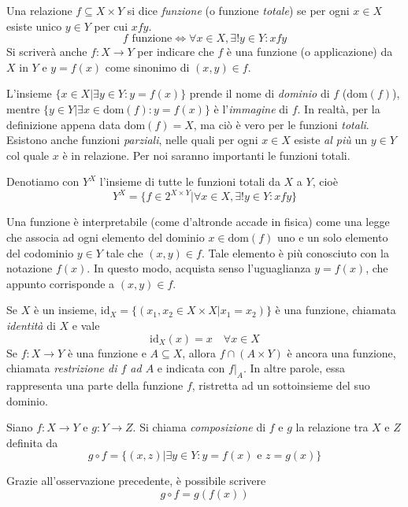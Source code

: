 \begin{tcolorbox}[colback=yellow!30, colframe=yellow!30!black, title={Funzione}]
Una relazione $f\subseteq X\times Y$ si dice \textit{funzione} (o funzione
\textit{totale}) se per ogni $x\in X$ esiste unico $y\in Y$ per cui $xfy$.
\[ f \text{ funzione} \Longleftrightarrow \forall x\in X,\exists!y\in Y:xfy \]
Si scriverà anche $f:X\to Y$ per indicare che $f$ è una funzione (o applicazione)
da $X$ in $Y$ e $y=f(x)$ come sinonimo di $(x,y)\in f$.
\end{tcolorbox}

L'insieme $\{x\in X|\exists y\in Y: y=f(x)\}$ prende il nome di \textit{dominio}
di $f$ ($\text{dom}(f)$), mentre $\{y\in Y|\exists x\in\text{dom}(f):y=f(x)\}$
è l'\textit{immagine} di $f$. In realtà, per la definizione appena data
$\text{dom}(f)=X$, ma ciò è vero per le funzioni \textit{totali}. Esistono
anche funzioni \textit{parziali}, nelle quali per ogni $x\in X$ esiste \textit{al più}
un $y\in Y$ col quale $x$ è in relazione. Per noi saranno importanti le funzioni
totali.

Denotiamo con $Y^X$ l'insieme di tutte le funzioni totali da $X$ a $Y$, cioè
\[ Y^X = \{f\in2^{X\times Y}| \forall x\in X, \exists!y\in Y: xfy\} \]
\begin{osservaz}
Una funzione è interpretabile (come d'altronde accade in fisica) come
una legge che associa ad ogni elemento del dominio $x\in\text{dom}(f)$
uno e un solo elemento del codominio $y\in Y$ tale che $(x,y)\in f$.
Tale elemento è più conosciuto con la notazione $f(x)$. In questo modo,
acquista senso l'uguaglianza $y = f(x)$, che appunto corrisponde a
$(x,y)\in f$.
\end{osservaz}
Se $X$ è un insieme, $\text{id}_X = \{(x_1,x_2\in X\times X| x_1=x_2)\}$ è
una funzione, chiamata \textit{identità} di $X$ e vale \[ \text{id}_X(x)=x \quad \forall x\in X\]
Se $f:X\to Y$ è una funzione e $A\subseteq X$, allora $f\cap(A\times Y)$
è ancora una funzione, chiamata \textit{restrizione di $f$ ad $A$} e indicata
con $f|_A$. In altre parole, essa rappresenta una parte della funzione $f$,
ristretta ad un sottoinsieme del suo dominio.

\begin{tcolorbox}[colback=yellow!30, colframe=yellow!30!black, title={Composizione}]
Siano $f:X\to Y$ e $g:Y\to Z$. Si chiama \textit{composizione}
di $f$ e $g$ la relazione tra $X$ e $Z$ definita da
\[ g\circ f = \{(x,z)| \exists y\in Y: y = f(x) \text{ e } z = g(x)\} \]
\end{tcolorbox}
\begin{osservaz}
Grazie all'osservazione precedente, è possibile scrivere \[ g\circ f = g(f(x)) \]
\end{osservaz}

